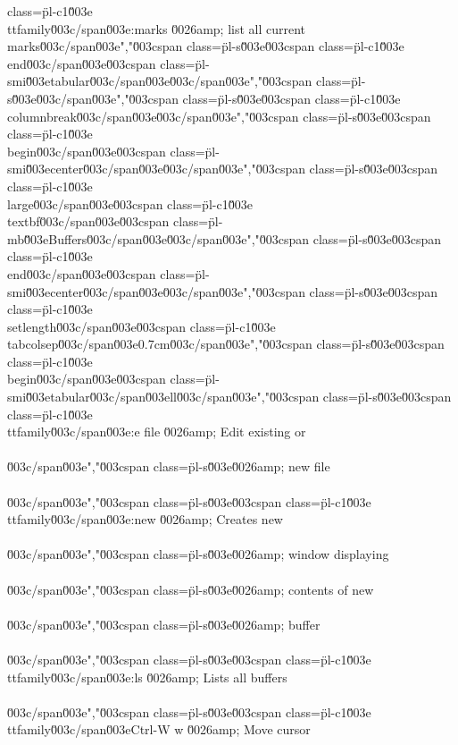 class=\"pl-c1\"\u003e\\ttfamily\u003c/span\u003e{:marks} \u0026amp; list all current marks\u003c/span\u003e","\u003cspan class=\"pl-s\"\u003e\u003cspan class=\"pl-c1\"\u003e\\end\u003c/span\u003e{\u003cspan class=\"pl-smi\"\u003etabular\u003c/span\u003e}\u003c/span\u003e","\u003cspan class=\"pl-s\"\u003e\u003c/span\u003e","\u003cspan class=\"pl-s\"\u003e\u003cspan class=\"pl-c1\"\u003e\\columnbreak\u003c/span\u003e\u003c/span\u003e","\u003cspan class=\"pl-s\"\u003e\u003cspan class=\"pl-c1\"\u003e\\begin\u003c/span\u003e{\u003cspan class=\"pl-smi\"\u003ecenter\u003c/span\u003e}\u003c/span\u003e","\u003cspan class=\"pl-s\"\u003e\u003cspan class=\"pl-c1\"\u003e\\large\u003c/span\u003e\u003cspan class=\"pl-c1\"\u003e\\textbf\u003c/span\u003e{\u003cspan class=\"pl-mb\"\u003eBuffers\u003c/span\u003e}\u003c/span\u003e","\u003cspan class=\"pl-s\"\u003e\u003cspan class=\"pl-c1\"\u003e\\end\u003c/span\u003e{\u003cspan class=\"pl-smi\"\u003ecenter\u003c/span\u003e}\u003c/span\u003e","\u003cspan class=\"pl-s\"\u003e\u003cspan class=\"pl-c1\"\u003e\\setlength\u003c/span\u003e{\u003cspan class=\"pl-c1\"\u003e\\tabcolsep\u003c/span\u003e}{0.7cm}\u003c/span\u003e","\u003cspan class=\"pl-s\"\u003e\u003cspan class=\"pl-c1\"\u003e\\begin\u003c/span\u003e{\u003cspan class=\"pl-smi\"\u003etabular\u003c/span\u003e}{ll}\u003c/span\u003e","\u003cspan class=\"pl-s\"\u003e\u003cspan class=\"pl-c1\"\u003e\\ttfamily\u003c/span\u003e{:e file} \u0026amp; Edit existing or\\\\\u003c/span\u003e","\u003cspan class=\"pl-s\"\u003e\u0026amp; new file\\\\\u003c/span\u003e","\u003cspan class=\"pl-s\"\u003e\u003cspan class=\"pl-c1\"\u003e\\ttfamily\u003c/span\u003e{:new} \u0026amp; Creates new\\\\\u003c/span\u003e","\u003cspan class=\"pl-s\"\u003e\u0026amp; window displaying\\\\\u003c/span\u003e","\u003cspan class=\"pl-s\"\u003e\u0026amp; contents of new\\\\\u003c/span\u003e","\u003cspan class=\"pl-s\"\u003e\u0026amp; buffer\\\\\u003c/span\u003e","\u003cspan class=\"pl-s\"\u003e\u003cspan class=\"pl-c1\"\u003e\\ttfamily\u003c/span\u003e{:ls} \u0026amp; Lists all buffers\\\\\u003c/span\u003e","\u003cspan class=\"pl-s\"\u003e\u003cspan class=\"pl-c1\"\u003e\\ttfamily\u003c/span\u003e{Ctrl-W w} \u0026amp; Move cursor 